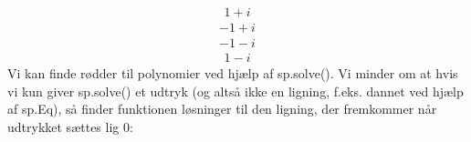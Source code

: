 \documentclass[letterpaper,10pt,english]{jupyterBook}
\begin{document}
\begin{sphinxVerbatim}[commandchars=\\\{\}]
   
        
        
\end{sphinxVerbatim}
\begin{equation*}
\begin{split}\displaystyle 1 + i\end{split}
\end{equation*}\begin{equation*}
\begin{split}\displaystyle -1 + i\end{split}
\end{equation*}\begin{equation*}
\begin{split}\displaystyle -1 - i\end{split}
\end{equation*}\begin{equation*}
\begin{split}\displaystyle 1 - i\end{split}
\end{equation*}
Vi kan finde rødder til polynomier ved hjælp af sp.solve(). Vi minder om at hvis vi kun giver sp.solve() et udtryk (og altså ikke en ligning, f.eks. dannet ved hjælp af sp.Eq), så finder funktionen løsninger til den ligning, der fremkommer når udtrykket sættes lig 0:
\end{document}
